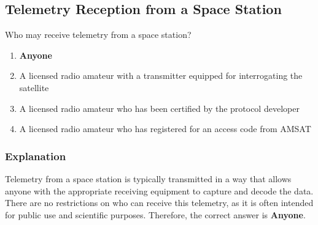 \subsection{Telemetry Reception from a Space Station}
\label{T8B11}

\begin{tcolorbox}[colback=gray!10!white,colframe=black!75!black,title=T8B11]
Who may receive telemetry from a space station?
\begin{enumerate}[noitemsep]
    \item \textbf{Anyone}
    \item A licensed radio amateur with a transmitter equipped for interrogating the satellite
    \item A licensed radio amateur who has been certified by the protocol developer
    \item A licensed radio amateur who has registered for an access code from AMSAT
\end{enumerate}
\end{tcolorbox}

\subsubsection*{Explanation}
Telemetry from a space station is typically transmitted in a way that allows anyone with the appropriate receiving equipment to capture and decode the data. There are no restrictions on who can receive this telemetry, as it is often intended for public use and scientific purposes. Therefore, the correct answer is \textbf{Anyone}.